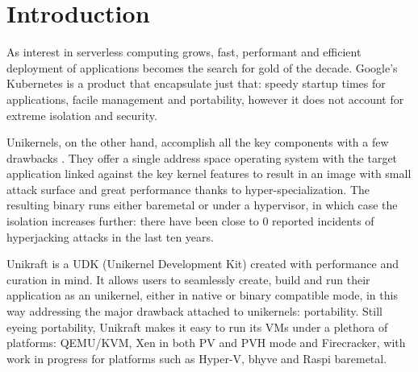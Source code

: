 \chapter{Introduction}
\label{chapter:intro}

As interest in serverless computing grows, fast, performant and efficient deployment of applications becomes the search for gold of the decade.
Google's Kubernetes \cite{k8s} is a product that encapsulate just that: speedy startup times for applications, facile management and portability, however it does not account for extreme isolation and security.

Unikernels, on the other hand, accomplish all the key components with a few drawbacks \cite{vm-safer}.
They offer a single address space operating system with the target application linked against the key kernel features to result in an image with small attack surface and great performance thanks to hyper-specialization.
The resulting binary runs either baremetal or under a hypervisor, in which case the isolation increases further: there have been close to 0 reported incidents of hyperjacking attacks in the last ten years.

Unikraft is a UDK (Unikernel Development Kit) \cite{unikraft} created with performance and curation in mind.
It allows users to seamlessly create, build and run their application as an unikernel, either in native or binary compatible mode, in this way addressing the major drawback attached to unikernels: portability.
Still eyeing portability, Unikraft makes it easy to run its VMs under a plethora of platforms: QEMU/KVM, Xen in both PV and PVH mode and Firecracker, with work in progress for platforms such as Hyper-V, bhyve and Raspi baremetal.


